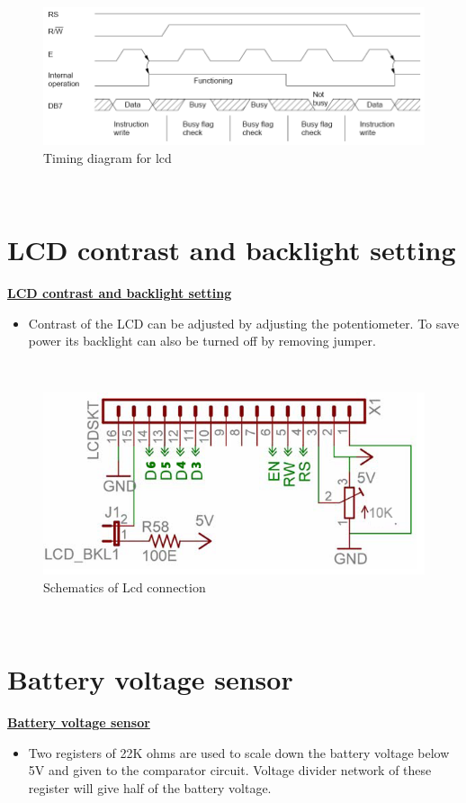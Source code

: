 \documentclass[a4paper,12pt,oneside]{book}
\begin{document}
	\hfill\\
	\begin{figure}[h!]
		\includegraphics[width=\textwidth]{./HardwareManual/lcd_timing_diagram.png}
		\caption{Timing diagram for lcd}
	\end{figure}	
	\hfill\\
	\newpage
	
	\chapter[LCD contrast and backlight setting]{LCD contrast and backlight setting}
	\underline{\textbf{\Large{LCD contrast and backlight setting}}}
	\begin{itemize}
	\item{Contrast of the LCD can be adjusted by adjusting the potentiometer. To save power its backlight can also be turned off by removing jumper.}
	\end{itemize}
	
	\hfill\\
	\begin{figure}[h!]
		\includegraphics[width=\textwidth]{./HardwareManual/lcd_connection.png}
		\caption{Schematics of Lcd connection}
	\end{figure}	
	\hfill\\
	\newpage
	
	\chapter[Battery voltage sensor]{Battery voltage sensor}
	\underline{\textbf{\Large{Battery voltage sensor}}}
	\begin{itemize}
		\item{Two registers of 22K ohms are used to scale down the battery voltage below 5V and given to the
			comparator circuit. Voltage divider network of these register will give half of the
			battery voltage.}
	\end{itemize}
\end{document}
